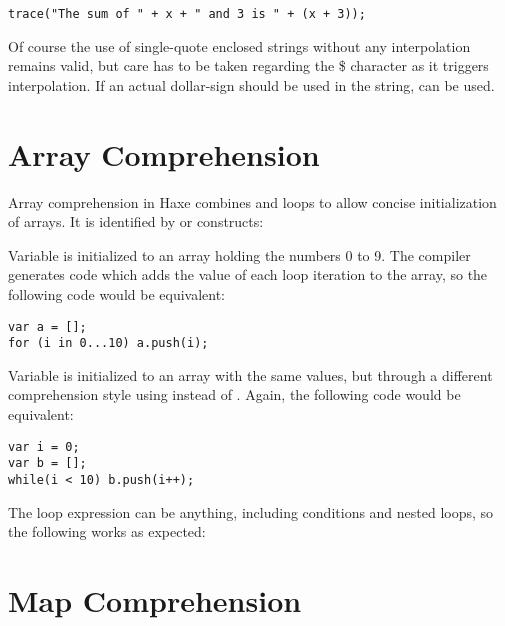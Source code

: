 \begin{lstlisting}
trace("The sum of " + x + " and 3 is " + (x + 3));
\end{lstlisting}
Of course the use of single-quote enclosed strings without any interpolation remains valid, but care has to be taken regarding the \$ character as it triggers interpolation. If an actual dollar-sign should be used in the string, \expr{\$\$} can be used.



\section{Array Comprehension}
\label{lf-array-comprehension}

Array comprehension in Haxe combines  and loops to allow concise initialization of arrays. It is identified by  or  constructs:


Variable  is initialized to an array holding the numbers 0 to 9. The compiler generates code which adds the value of each loop iteration to the array, so the following code would be equivalent:

\begin{lstlisting}
var a = [];
for (i in 0...10) a.push(i);
\end{lstlisting}

Variable  is initialized to an array with the same values, but through a different comprehension style using  instead of . Again, the following code would be equivalent:

\begin{lstlisting}
var i = 0;
var b = [];
while(i < 10) b.push(i++);
\end{lstlisting}

The loop expression can be anything, including conditions and nested loops, so the following works as expected:


\section{Map Comprehension}
\label{lf-map-comprehension}

